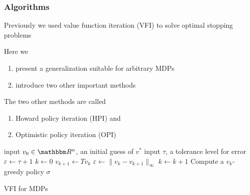 \documentclass[xcolor=dvipsnames]{beamer}
\newcommand{\RR}{\mathbbm R}
\renewcommand{\epsilon}{\varepsilon}
\newcommand{\1}{\mathbbm 1}
\begin{document}
\begin{frame}
    \frametitle{Algorithms}

    Previously we used value function iteration (VFI) to solve optimal
    stopping problems

    \vspace{0.5em}
    \vspace{0.5em}
    Here we
    \begin{enumerate}
        \item present a generalization suitable for arbitrary MDPs
    \vspace{0.5em}
        \item introduce two other important methods
    \end{enumerate}

    \vspace{0.5em}
    The two other methods are called
    \begin{enumerate}
        \item Howard policy iteration (HPI) and
    \vspace{0.5em}
        \item Optimistic policy iteration (OPI)
    \end{enumerate}


\end{frame}


\begin{frame}
    
{\small 
    \begin{algorithm}[H]
    \DontPrintSemicolon
    input $v_0 \in \RR^n$, an initial guess of $v^*$ \;
    input $\tau$, a tolerance level for error \;
    $\epsilon \leftarrow \tau + 1$ \;
    $k \leftarrow 0$ \;
    \While{$\epsilon > \tau $}
    {
        $v_{k+1} \leftarrow Tv_k$ \;
        $\epsilon \leftarrow \| v_k - v_{k+1} \|_\infty$ \;
        $k \leftarrow k + 1$ \;
    }
    Compute a $v_k$-greedy policy $\sigma$ \;
    \Return{$\sigma$}
    \caption{VFI for MDPs}
    \end{algorithm}
}

\end{frame}
\end{document}
